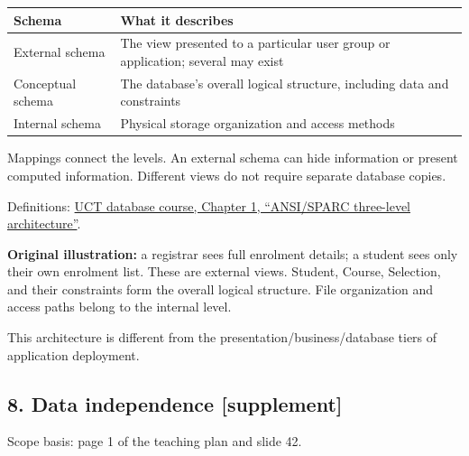 \begin{longtable}[]{@{}
  >{\raggedright\arraybackslash}p{}
  >{\raggedright\arraybackslash}p{}@{}}
\toprule\noalign{}
\begin{minipage}[b]{\linewidth}\raggedright
Schema
\end{minipage} & \begin{minipage}[b]{\linewidth}\raggedright
What it describes
\end{minipage} \\
\midrule\noalign{}
\endhead
\bottomrule\noalign{}
\endlastfoot
External schema & The view presented to a particular user group or application; several may exist \\
Conceptual schema & The database's overall logical structure, including data and constraints \\
Internal schema & Physical storage organization and access methods \\
\end{longtable}

Mappings connect the levels. An external schema can hide information or present computed information. Different views do not require separate database copies.

Definitions: \href{https://www.cs.uct.ac.za/mit_notes/database/htmls/chp01.html}{UCT database course, Chapter 1, ``ANSI/SPARC three-level architecture''}.

\textbf{Original illustration:} a registrar sees full enrolment details; a student sees only their own enrolment list. These are external views. Student, Course, Selection, and their constraints form the overall logical structure. File organization and access paths belong to the internal level.

This architecture is different from the presentation/business/database tiers of application deployment.

\subsection{8. Data independence {[}supplement{]}}\label{01_database_fundamentals_en-data-independence-supplement}

Scope basis: page 1 of the teaching plan and slide 42.

